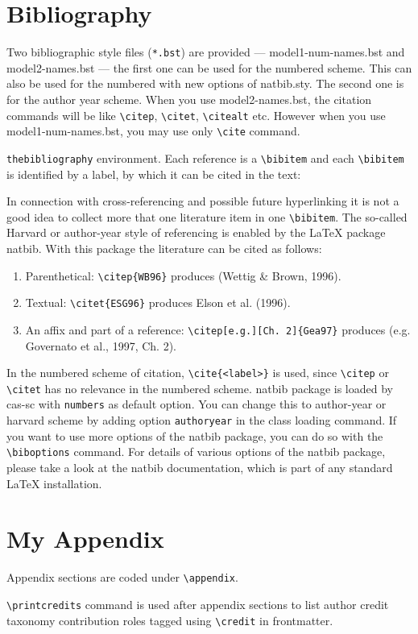 \documentclass[a4paper,fleqn]{cas-sc}
\begin{document}
\section{Bibliography}

Two bibliographic style files (\verb+*.bst+) are provided ---
{model1-num-names.bst} and {model2-names.bst} --- the first one can be
used for the numbered scheme. This can also be used for the numbered
with new options of {natbib.sty}. The second one is for the author year
scheme. When  you use model2-names.bst, the citation commands will be
like \verb+\citep+,  \verb+\citet+, \verb+\citealt+ etc. However when
you use model1-num-names.bst, you may use only \verb+\cite+ command.

\verb+thebibliography+ environment.  Each reference is a\linebreak
\verb+\bibitem+ and each \verb+\bibitem+ is identified by a label,
by which it can be cited in the text:

\noindent In connection with cross-referencing and
possible future hyperlinking it is not a good idea to collect
more that one literature item in one \verb+\bibitem+.  The
so-called Harvard or author-year style of referencing is enabled
by the \LaTeX{} package {natbib}. With this package the
literature can be cited as follows:

\begin{enumerate}[\textbullet]
\item Parenthetical: \verb+\citep{WB96}+ produces (Wettig \& Brown, 1996).
\item Textual: \verb+\citet{ESG96}+ produces Elson et al. (1996).
\item An affix and part of a reference:\break
\verb+\citep[e.g.][Ch. 2]{Gea97}+ produces (e.g. Governato et
al., 1997, Ch. 2).
\end{enumerate}

In the numbered scheme of citation, \verb+\cite{<label>}+ is used,
since \verb+\citep+ or \verb+\citet+ has no relevance in the numbered
scheme.  {natbib} package is loaded by {cas-sc} with
\verb+numbers+ as default option.  You can change this to author-year
or harvard scheme by adding option \verb+authoryear+ in the class
loading command.  If you want to use more options of the {natbib}
package, you can do so with the \verb+\biboptions+ command.  For
details of various options of the {natbib} package, please take a
look at the {natbib} documentation, which is part of any standard
\LaTeX{} installation.

\appendix
\section{My Appendix}
Appendix sections are coded under \verb+\appendix+.

\verb+\printcredits+ command is used after appendix sections to list 
author credit taxonomy contribution roles tagged using \verb+\credit+ 
in frontmatter.

\printcredits

% 



\end{document}
